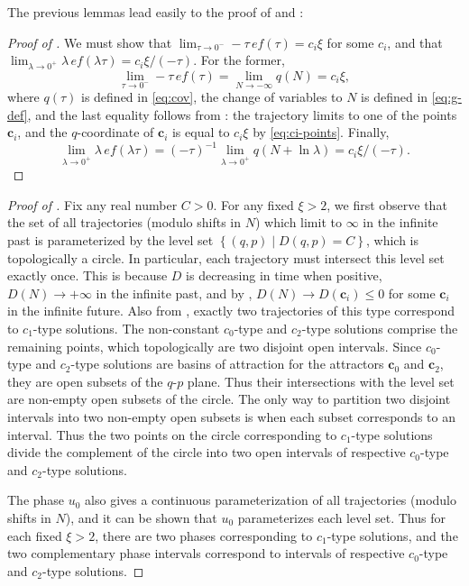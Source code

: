 The previous lemmas lead easily to the proof of  and :
\begin{proof}[Proof of ]
\label{pf:bg-future} We must show that $\lim_{\tau\to0^{-}}-\tau\,ef(\tau)=c_{i}\xi$ for some $c_{i}$, and that $\lim_{\lambda\to0^{+}}\lambda\,ef(\lambda\tau)=c_{i}\xi/(-\tau)$. For the former, 
\[
\lim_{\tau\to0^{-}}-\tau\,ef(\tau)=\lim_{N\to-\infty}q(N)=c_{i}\xi,
\]
 where $q(\tau)$ is defined in \eqref{eq:cov}, the change of variables to $N$ is defined in \eqref{eq:g-def}, and the last equality follows from : the trajectory limits to one of the points $\mathbf{c}_{i}$, and the $q$-coordinate of $\mathbf{c}_{i}$ is equal to $c_{i}\xi$ by \eqref{eq:ci-points}. Finally, 
\[
\lim_{\lambda\to0^{+}}\lambda\,ef(\lambda\tau)=(-\tau)^{-1}\lim_{\lambda\to0^{+}}q(N+\ln\lambda)=c_{i}\xi/(-\tau).
\]
 
\end{proof}
%
\begin{proof}[Proof of ]
 Fix any real number $C>0$. For any fixed $\xi>2$, we first observe that the set of all trajectories (modulo shifts in $N$) which limit to $\bm{\infty}$ in the infinite past is parameterized by the level set $\left\{ (q,p)\mid D(q,p)=C\right\} $, which is topologically a circle. In particular, each trajectory must intersect this level set exactly once. This is because $D$ is decreasing in time when positive, $D(N)\to+\infty$ in the infinite past, and by , $D(N)\to D(\mathbf{c}_{i})\leq0$ for some $\mathbf{c}_{i}$ in the infinite future. Also from , exactly two trajectories of this type correspond to $c_{1}$\nobreakdash-type solutions. The non-constant $c_{0}$\nobreakdash-type and $c_{2}$\nobreakdash-type solutions comprise the remaining points, which topologically are two disjoint open intervals. Since $c_{0}$\nobreakdash-type and $c_{2}$\nobreakdash-type solutions are basins of attraction for the attractors $\mathbf{c}_{0}$ and $\mathbf{c}_{2}$, they are open subsets of the $q$-$p$ plane. Thus their intersections with the level set are non-empty open subsets of the circle. The only way to partition two disjoint intervals into two non-empty open subsets is when each subset corresponds to an interval. Thus the two points on the circle corresponding to $c_{1}$\nobreakdash-type solutions divide the complement of the circle into two open intervals of respective $c_{0}$\nobreakdash-type and $c_{2}$\nobreakdash-type solutions. 

The phase $u_{0}$ also gives a continuous parameterization of all trajectories (modulo shifts in $N$), and it can be shown that $u_{0}$ parameterizes each level set. Thus for each fixed $\xi>2$, there are two phases corresponding to $c_{1}$\nobreakdash-type solutions, and the two complementary phase intervals correspond to intervals of respective $c_{0}$\nobreakdash-type and $c_{2}$\nobreakdash-type solutions.
\end{proof}

